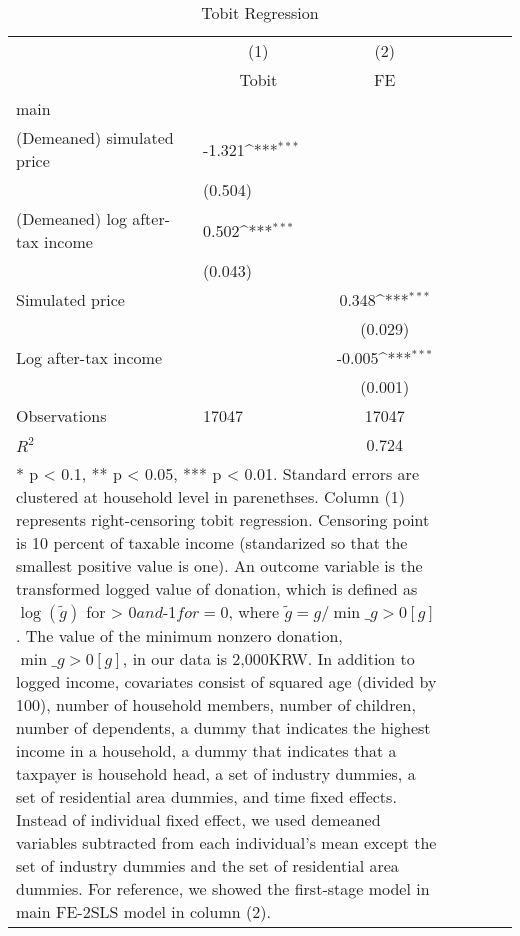 \begin{table}[htbp]\centering
\def\sym#1{\ifmmode^{#1}\else\(^{#1}\)\fi}
\caption{Tobit Regression}
\begin{tabular}{l*{2}{lcc}}
\toprule
                    &\multicolumn{1}{c}{(1)}&\multicolumn{1}{c}{(2)}\\
                    &\multicolumn{1}{c}{Tobit}&\multicolumn{1}{c}{FE}\\
\midrule
main                &                     &                     \\
(Demeaned) simulated price&      -1.321\sym{***}&                     \\
                    &     (0.504)         &                     \\
(Demeaned) log after-tax income&       0.502\sym{***}&                     \\
                    &     (0.043)         &                     \\
Simulated price     &                     &       0.348\sym{***}\\
                    &                     &     (0.029)         \\
Log after-tax income&                     &      -0.005\sym{***}\\
                    &                     &     (0.001)         \\
\midrule
Observations        &       17047         &       17047         \\
\(R^{2}\)           &                     &       0.724         \\
\bottomrule
\multicolumn{3}{l}{\footnotesize \parbox{15cm}{* p < 0.1, ** p < 0.05, *** p < 0.01. Standard errors are clustered at household level in parenethses. Column (1) represents right-censoring tobit regression. Censoring point is 10 percent of taxable income (standarized so that the smallest positive value is one). An outcome variable is the transformed logged value of donation, which is defined as $\log(\tilde{g})$ for  > 0$ and $-1$ for =0$, where $\tilde{g}=g/\min\_{g>0}[g]$. The value of the minimum nonzero donation, $\min\_{g>0}[g]$, in our data is 2,000KRW. In addition to logged income, covariates consist of squared age (divided by 100), number of household members, number of children, number of dependents, a dummy that indicates the highest income in a household, a dummy that indicates that a taxpayer is household head, a set of industry dummies, a set of residential area dummies, and time fixed effects. Instead of individual fixed effect, we used demeaned variables subtracted from each individual's mean except the set of industry dummies and the set of residential area dummies. For reference, we showed the first-stage model in main FE-2SLS model in column (2).}}\\
\end{tabular}
\end{table}

